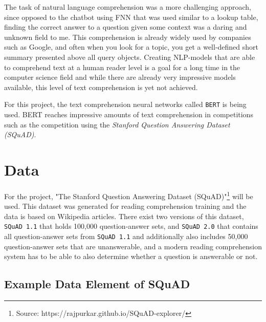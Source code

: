         The task of natural language comprehension was a more challenging approach, since opposed to the chatbot using FNN that was used similar to a lookup table, finding the correct answer to a question given some context was a daring and unknown field to me.
        This comprehension is already widely used by companies such as Google, and often when you look for a topic, you get a well-defined short summary presented above all query objects.
        Creating NLP-models that are able to comprehend text at a human reader level is a goal for a long time in the computer science field and while there are already very impressive models available, this level of text comprehension is yet not achieved.
        
        For this project, the text comprehension neural networks called \texttt{BERT} is being used.
        BERT reaches impressive amounts of text comprehension in competitions such as the competition using the \emph{Stanford Question Answering Dataset (SQuAD)}.



    \section{Data}
    \label{sec:data}

        For the project, "The Stanford Question Answering Dataset (SQuAD)"\footnote{Source: https://rajpurkar.github.io/SQuAD-explorer/} will be used. This dataset was generated for reading comprehension training and the data is based on Wikipedia articles.
        There exist two versions of this dataset, \texttt{SQuAD 1.1} that holds 100,000 question-answer sets, and \texttt{SQuAD 2.0} that contains all question-answer sets from \texttt{SQuAD 1.1} and additionally also includes 50,000 question-answer sets that are unanswerable, and a modern reading comprehension system has to be able to also determine whether a question is answerable or not.


        \subsection{Example Data Element of SQuAD}
        \label{subsec:data-example}

